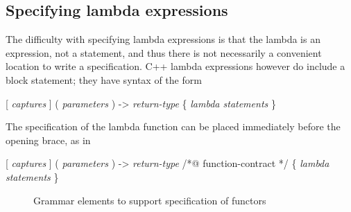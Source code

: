 \subsection{Specifying lambda expressions}

The difficulty with specifying lambda expressions is that the lambda is an expression, not a statement, and thus there is not necessarily a convenient location to write a specification.
C++ lambda expressions however do include a block statement; they have syntax of the form\\
\centerline{ [ \textit{captures} ] ( \textit{parameters} ) -> \textit{return-type}  \{ \textit{lambda statements} \} }
The specification of the lambda function can be placed immediately before the opening brace, as in \\
\centerline{ [ \textit{captures} ] ( \textit{parameters} ) -> \textit{return-type} /*@ function-contract */ \{ \textit{lambda statements} \} }

\begin{figure}[htp]
\begin{cadre}

\end{cadre}
\caption{Grammar elements to support specification of functors}
\label{fig:gram:functional}
\end{figure}
